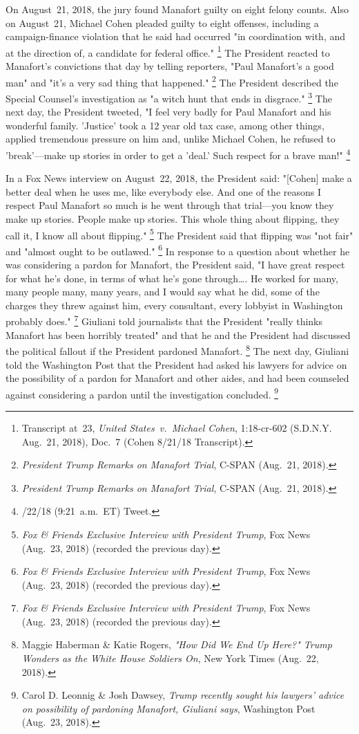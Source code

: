 On August~21, 2018, the jury found Manafort guilty on eight felony counts.
Also on August~21, Michael Cohen pleaded guilty to eight offenses, including a campaign-finance violation that he said had occurred "in coordination with, and at the direction of, a candidate for federal office."%
\footnote{Transcript at~23, \textit{United States~v.\ Michael Cohen}, 1:18-cr-602 (S.D.N.Y. Aug.~21, 2018), Doc.~7 (Cohen 8/21/18 Transcript).}
The President reacted to Manafort's convictions that day by telling reporters, "Paul Manafort's a good man" and "it's a very sad thing that happened."%
\footnote{\textit{President Trump Remarks on Manafort Trial}, C-SPAN (Aug.~21, 2018).}
The President described the Special Counsel's investigation as "a witch hunt that ends in disgrace."%
\footnote{\textit{President Trump Remarks on Manafort Trial}, C-SPAN (Aug.~21, 2018).}
The next day, the President tweeted, "I feel very badly for Paul Manafort and his wonderful family.
'Justice' took a 12 year old tax case, among other things, applied tremendous pressure on him and, unlike Michael Cohen, he refused to 'break'---make up stories in order to get a 'deal.'
Such respect for a brave man!"%
\footnote{/22/18 (9:21~a.m.~ET) Tweet.}

In a Fox News interview on August~22, 2018, the President said: "[Cohen] make a better deal when he uses me, like everybody else.
And one of the reasons I respect Paul Manafort so much is he went through that trial---you know they make up stories.
People make up stories.
This whole thing about flipping, they call it, I know all about flipping."%
\footnote{\textit{Fox \& Friends Exclusive Interview with President Trump}, Fox News (Aug.~23, 2018) (recorded the previous day).}
The President said that flipping was "not fair" and "almost ought to be outlawed."%
\footnote{\textit{Fox \& Friends Exclusive Interview with President Trump}, Fox News (Aug.~23, 2018) (recorded the previous day).}
In response to a question about whether he was considering a pardon for Manafort, the President said, "I have great respect for what he's done, in terms of what he's gone through\dots.
He worked for many, many people many, many years, and I would say what he did, some of the charges they threw against him, every consultant, every lobbyist in Washington probably does."%
\footnote{\textit{Fox \& Friends Exclusive Interview with President Trump}, Fox News (Aug.~23, 2018) (recorded the previous day).}
Giuliani told journalists that the President "really thinks Manafort has been horribly treated" and that he and the President had discussed the political fallout if the President pardoned Manafort.%
\footnote{Maggie Haberman \& Katie Rogers, \textit{"How Did We End Up Here?" Trump Wonders as the White House Soldiers On}, New York Times (Aug.~22, 2018).}
The next day, Giuliani told the Washington Post that the President had asked his lawyers for advice on the possibility of a pardon for Manafort and other aides, and had been counseled against considering a pardon until the investigation concluded.%
\footnote{Carol D. Leonnig \& Josh Dawsey, \textit{Trump recently sought his lawyers' advice on possibility of pardoning Manafort, Giuliani says}, Washington Post (Aug.~23, 2018).}


